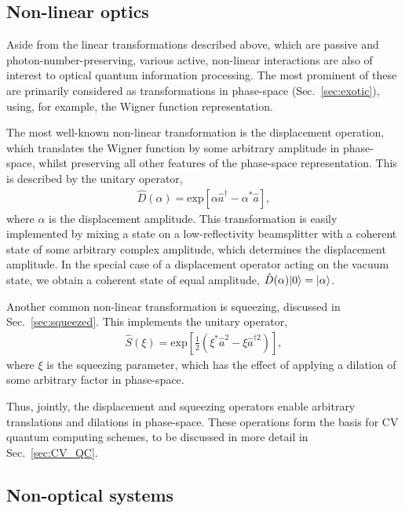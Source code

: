 %
%

\subsection{Non-linear optics} \label{sec:non_lin_opt} 

Aside from the linear transformations described above, which are passive and photon-number-preserving, various active, non-linear interactions are also of interest to optical quantum information processing. The most prominent of these are primarily considered as transformations in phase-space (Sec.~\ref{sec:exotic}), using, for example, the Wigner function representation.

The most well-known non-linear transformation is the displacement operation, which translates the Wigner function by some arbitrary amplitude in phase-space, whilst preserving all other features of the phase-space representation. This is described by the unitary operator,
\begin{align}
\hat{D}(\alpha) = \mathrm{exp}\left[\alpha\hat{a}^\dag - \alpha^*\hat{a}\right],
\end{align}
where $\alpha$ is the displacement amplitude. This transformation is easily implemented by mixing a state on a low-reflectivity beamsplitter with a coherent state of some arbitrary complex amplitude, which determines the displacement amplitude. In the special case of a displacement operator acting on the vacuum state, we obtain a coherent state of equal amplitude, \mbox{$\hat{D}(\alpha)|0\rangle=|\alpha\rangle$}.

Another common non-linear transformation is squeezing, discussed in Sec.~\ref{sec:squeezed}. This implements the unitary operator,
\begin{align}
\hat{S}(\xi) = \mathrm{exp}\left[ \frac{1}{2}(\xi^*\hat{a}^2 - \xi{\hat{a}^{\dag 2}})\right],
\end{align}
where $\xi$ is the squeezing parameter, which has the effect of applying a dilation of some arbitrary factor in phase-space.

Thus, jointly, the displacement and squeezing operators enable arbitrary translations and dilations in phase-space. These operations form the basis for CV quantum computing schemes, to be discussed in more detail in Sec.~\ref{sec:CV_QC}.

%
%

\subsection{Non-optical systems}

